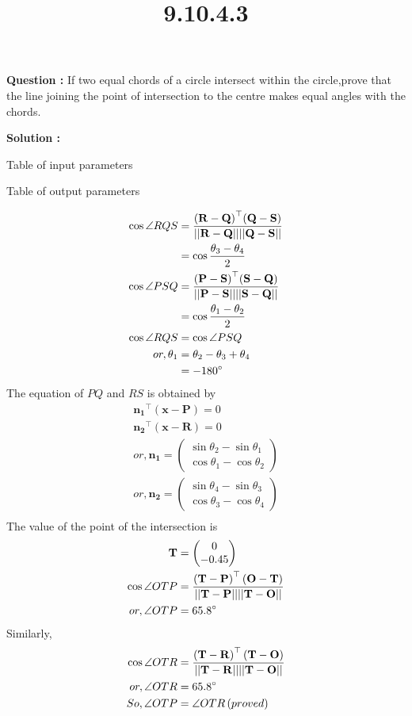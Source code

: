 \documentclass[12pt]{article}
\providecommand{\brak}[1]{\ensuremath{\left(#1\right)}}
\providecommand{\myvec}[1]{\ensuremath{\begin{pmatrix}#1\end{pmatrix}}}
\providecommand{\norm}[1]{\ensuremath{\lvert|#1\rvert|}}
\let\vec\mathbf
\begin{document}
\title{\textbf{9.10.4.3}}
\date{}
\maketitle
\textbf{Question :} If two equal chords of a circle intersect within the circle,prove that the line joining the point of intersection to the centre makes equal angles with the chords.

\textbf{Solution :}

\begin{table}[H]
    \centering
    
    \caption{Table of input parameters}
    \label{tab:tab:1}
\end{table}

\begin{table}[]
    \centering

\caption{Table of output parameters}
    \label{tab:tab:2}
\end{table}

\begin{align}
  \cos{\angle RQS}&=\frac{\vec{\brak{R-Q}}^{\top}\vec{\brak{Q-S}}}{\vec{\norm{R-Q}\norm{Q-S}}}\\
  &=\cos{\frac{\theta_3-\theta_4}{2}}\\
   \cos{\angle PSQ}&=\frac{\vec{\brak{P-S}}^{\top}\vec{\brak{S-Q}}}{\vec{\norm{P-S}\norm{S-Q}}}\\
  &=\cos{\frac{\theta_1-\theta_2}{2}}\\
   \cos{\angle RQS}&=\cos{\angle PSQ}\\
   or,\theta_1&=\theta_2-\theta_3+\theta_4\\
   &=-180\degree
  \end{align}
The equation of $PQ$ and $RS$ is obtained by
\begin{align}
  \vec{n_1}^{\top}\vec{\brak{x-P}}=0\\
  \vec{n_2}^{\top}\vec{\brak{x-R}}=0\\
  or,\vec{n_1}=\myvec{\sin{\theta_2}-\sin{\theta_1}\\\cos{\theta_1}-\cos{\theta_2}}\\
  or,\vec{n_2}=\myvec{\sin{\theta_4}-\sin{\theta_3}\\\cos{\theta_3}-\cos{\theta_4}}\\
 \end{align}
  The value of the point of the intersection is
  \begin{align}
      \vec{T} &= \myvec{0\\-0.45}\\
\cos{\angle OTP} &= \frac{\brak{\vec{T-P}}^{\top}\brak{\vec{O-T}}}{\vec{\norm{T-P}\norm{T-O}}}\\
or, \angle OTP&= 65.8\degree
\end{align}
Similarly,
\begin{align}
   \cos{\angle OTR} &= \frac{\brak{\vec{T-R}}^{\top}\brak{\vec{T-O}}}{\vec{\norm{T-R}\norm{T-O}}}\\
or, \angle OTR&= 65.8\degree \\
So,\angle OTP &= \angle OTR \brak{proved}
\end{align}
\end{document}

